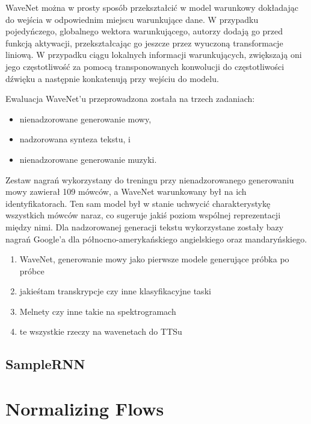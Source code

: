 \documentclass[magisterska]{pracamgr}
\begin{document}
WaveNet można w prosty sposób przekształcić w model warunkowy dokładając do wejścia w odpowiednim miejscu warunkujące dane. W przypadku pojedyńczego, globalnego wektora warunkującego, autorzy dodają go przed funkcją aktywacji, przekształcając go jeszcze przez wyuczoną transformacje liniową. W przypadku ciągu lokalnych informacji warunkujących, zwiększają oni jego częstotliwość za pomocą transponowanych konwolucji do częstotliwości dźwięku a następnie konkatenują przy wejściu do modelu.

Ewaluacja WaveNet'u przeprowadzona została na trzech zadaniach:
\begin{itemize}
    \setlength\itemsep{0em}
    \item nienadzorowane generowanie mowy,
    \item nadzorowana synteza tekstu, i
    \item nienadzorowane generowanie muzyki.
\end{itemize}
Zestaw nagrań wykorzystany do treningu przy nienadzorowanego generowaniu mowy \cite{Veaux2017CSTRVC} zawierał 109 mówców, a WaveNet warunkowany był na ich identyfikatorach. Ten sam model był w stanie uchwycić charakterystykę wszystkich mówców naraz, co sugeruje jakiś poziom wspólnej reprezentacji między nimi. Dla nadzorowanej generacji tekstu wykorzystane zostały bazy nagrań Google'a dla północno-amerykańskiego angielskiego oraz mandaryńskiego.

\begin{enumerate}
    \setlength\itemsep{0em}
    \item WaveNet, generowanie mowy jako pierwsze modele generujące próbka po próbce
    \item jakieśtam transkrypcje czy inne klasyfikacyjne taski
    \item Melnety czy inne takie na spektrogramach
    \item te wszystkie rzeczy na wavenetach do TTSu
\end{enumerate}

\subsection{SampleRNN}

\subsection{}

\section{Normalizing Flows}
\end{document}

